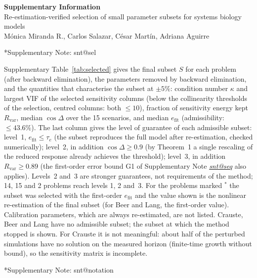 \documentclass[11pt]{article}
\makeatletter
\theoremstyle{definition}
\theoremstyle{plain}
\theoremstyle{remark}
\let\oldsection\section \let\oldsubsection\subsection \let\oldsubsubsection\subsubsection
\renewcommand{\section}{\@ifstar{\tocstar{section}{\oldsection}}{\oldsection}}
\renewcommand{\subsection}{\@ifstar{\tocstar{subsection}{\oldsubsection}}{\oldsubsection}}
\renewcommand{\subsubsection}{\@ifstar{\tocstar{subsubsection}{\oldsubsubsection}}{\oldsubsubsection}}
\newcommand{\tocstar}[3]{#2*{#3}\phantomsection\addcontentsline{toc}{#1}{#3}}
\newcommand{\nt}[1]{\csname snt@#1\endcsname}
\newcommand{\snote}[1]{\section*{Supplementary Note: \nt{#1}}\label{note:#1}}
\newcommand{\sref}[1]{Supplementary Note \hyperref[note:#1]{\emph{\nt{#1}}}}
\makeatother
\begin{document}
\begin{center}
{\large\bfseries Supplementary Information}\\[4pt]
{\large Re-estimation-verified selection of small parameter subsets for systems biology models}\\[6pt]
M\'onica Miranda R., Carlos Salazar, C\'esar Mart\'in, Adriana Aguirre
\end{center}

{\small
\renewcommand{\contentsname}{Contents}
{\let\section\oldsection\tableofcontents}
}
\clearpage

\snote{sel}

Supplementary Table~\ref{tab:selected} gives the final subset $S$ for each problem (after backward elimination), the parameters removed by backward elimination, and the quantities that characterise the subset at $\pm5\%$: condition number $\kappa$ and largest VIF of the selected sensitivity columns (below the collinearity thresholds of the selection, centred columns: both $\le10$), fraction of sensitivity energy kept $R_{\mathrm{var}}$, median $\cos\Delta$ over the 15 scenarios, and median $e_{\mathrm{fit}}$ (admissibility: $\le43.6\%$). The last column gives the level of guarantee of each admissible subset: level~1, $e_{\mathrm{fit}}\le\tau_e$ (the subset reproduces the full model after re-estimation, checked numerically); level~2, in addition $\cos\Delta\ge0.9$ (by Theorem~1 a single rescaling of the reduced response already achieves the threshold); level~3, in addition $R_{\mathrm{var}}\ge0.89$ (the first-order error bound G1 of \sref{seq} also applies). Levels~2 and~3 are stronger guarantees, not requirements of the method; 14, 15 and 2 problems reach levels 1, 2 and~3. For the problems marked $^{\ast}$ the subset was selected with the first-order $e_{\mathrm{fit}}$ and the value shown is the nonlinear re-estimation of the final subset (for Beer and Lang, the first-order value). Calibration parameters, which are always re-estimated, are not listed. Crauste, Beer and Lang have no admissible subset; the subset at which the method stopped is shown. For Crauste it is not meaningful: about half of the perturbed simulations have no solution on the measured horizon (finite-time growth without bound), so the sensitivity matrix is incomplete.

{\small

}

\snote{notation}
\end{document}
